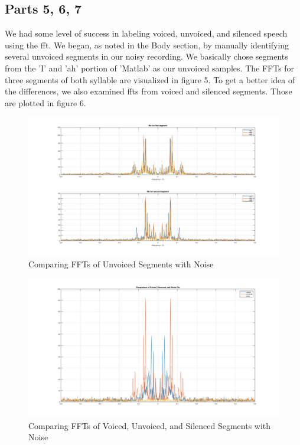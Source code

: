 \documentclass[11pt]{article}
\begin{document}
\subsection{Parts 5, 6, 7}
We had some level of success in labeling voiced, unvoiced, and silenced speech using the fft. We began, as noted in the Body section, by manually identifying several unvoiced segments in our noisy recording. We basically chose segments from the 'I' and 'ah' portion of 'Matlab' as our unvoiced samples. The FFTs for three segments of both syllable are visualized in figure 5. To get a better idea of the differences, we also examined ffts from voiced and silenced segments. Those are plotted in figure 6. 

\begin{figure}[H]
  \centering
  \includegraphics[scale=.25]{part_5_ffts_unvoiced.png}
  \caption{Comparing FFTs of Unvoiced Segments with Noise}
\end{figure}

\begin{figure}[H]
  \centering
  \includegraphics[scale=.25]{part_5_ffts_comparison.png}
  \caption{Comparing FFTs of Voiced, Unvoiced, and Silenced Segments with Noise}
\end{figure}
\end{document}

